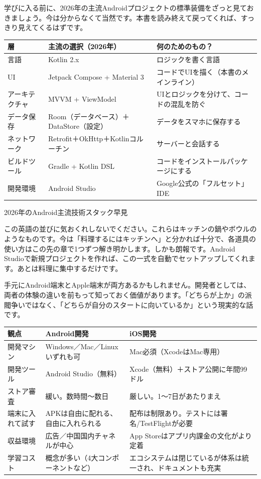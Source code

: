 
学びに入る前に、2026年の主流Androidプロジェクトの標準装備をざっと見ておきましょう。今は分からなくて当然です。本書を読み終えて戻ってくれば、すっきり見えてくるはずです。

\begin{center}
\begin{tabularx}{\linewidth}{|X|X|X|}
\hline
\textbf{層} & \textbf{主流の選択（2026年）} & \textbf{何のためのもの？} \tabularnewline
\hline
言語 & Kotlin 2.x & ロジックを書く言語 \tabularnewline
UI & Jetpack Compose + Material 3 & コードでUIを描く（本書のメインライン） \tabularnewline
アーキテクチャ & MVVM + ViewModel & UIとロジックを分けて、コードの混乱を防ぐ \tabularnewline
データ保存 & Room（データベース）＋DataStore（設定） & データをスマホに保存する \tabularnewline
ネットワーク & Retrofit＋OkHttp＋Kotlinコルーチン & サーバーと会話する \tabularnewline
ビルドツール & Gradle + Kotlin DSL & コードをインストールパッケージにする \tabularnewline
開発環境 & Android Studio & Google公式の「フルセット」IDE \tabularnewline
\hline
\end{tabularx}
\end{center}

\begin{center}\small\color{gray}2026年のAndroid主流技術スタック早見\end{center}

この英語の並びに気おくれしないでください。これらはキッチンの鍋やボウルのようなものです。今は「料理するにはキッチンへ」と分かれば十分で、各道具の使い方はこの先の章で1つずつ解き明かします。しかも朗報です。Android Studioで新規プロジェクトを作れば、この一式を自動でセットアップしてくれます。あとは料理に集中するだけです。


手元にAndroid端末とApple端末が両方あるかもしれません。開発者としては、両者の体験の違いを前もって知っておく価値があります。「どちらが上か」の派閥争いではなく、「どちらが自分のスタートに向いているか」という現実的な話です。

\begin{center}
\begin{tabularx}{\linewidth}{|X|X|X|}
\hline
\textbf{観点} & \textbf{Android開発} & \textbf{iOS開発} \tabularnewline
\hline
開発マシン & Windows／Mac／Linuxいずれも可 & Mac必須（XcodeはMac専用） \tabularnewline
開発ツール & Android Studio（無料） & Xcode（無料）＋ストア公開に年間99ドル \tabularnewline
ストア審査 & 緩い。数時間〜数日 & 厳しい。1〜7日があたりまえ \tabularnewline
端末に入れて試す & APKは自由に配れる、自由に入れられる & 配布は制限あり。テストには署名/TestFlightが必要 \tabularnewline
収益環境 & 広告／中国国内チャネルが中心 & App Storeはアプリ内課金の文化がより定着 \tabularnewline
学習コスト & 概念が多い（4大コンポーネントなど） & エコシステムは閉じているが体系は統一され、ドキュメントも充実 \tabularnewline
\hline
\end{tabularx}
\end{center}

